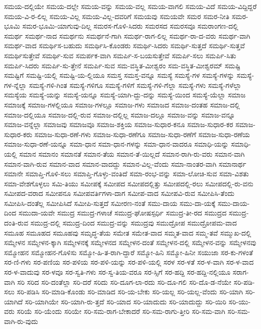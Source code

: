 {ಸಮಯ-ದಲ್ಲಿಯೇ
ಸಮಯ-ದಲ್ಲೇ
ಸಮಯ-ವನ್ನು
ಸಮಯ-ವಲ್ಲ
ಸಮಯ-ವಾಗಲಿ
ಸಮಯ-ವಿದೆ
ಸಮಯ-ವಿದ್ದಿದ್ದರೆ
ಸಮಯ-ವಿ-ರ-ಲಿಲ್ಲ
ಸಮಯ-ವಿಲ್ಲ
ಸಮಯ-ವಿಲ್ಲ-ದವರಿಗೆ
ಸಮಯವು
ಸಮಯವೇ
ಸಮರ
ಸಮರ-ನೀತಿ
ಸಮರ-ಭೂಮಿ
ಸಮರ-ಭೂಮಿ-ಯಾಗುವು-ದಿಲ್ಲ
ಸಮರಸ-ಗೊಳಿ-ಸಿದರು
ಸಮರಸದ
ಸಮರಸವೂ
ಸಮರಾಂಗಣ-ದಲ್ಲಿ
ಸಮರ್ಥ
ಸಮರ್ಥ-ನಾದ
ಸಮರ್ಥನು
ಸಮರ್ಥನೆ-ಗಾಗಿ
ಸಮರ್ಥ-ರಾಗ-ಲಿಲ್ಲ
ಸಮರ್ಥ-ರಾ-ದ-ವರು
ಸಮರ್ಥ-ವಾಗಿ
ಸಮರ್ಥ-ವಾದ
ಸಮರ್ಥಿಸ-ಬಹುದು
ಸಮರ್ಥಿಸಿ-ಕೊಂಡರು
ಸಮರ್ಥಿ-ಸಿದರು
ಸಮರ್ಥಿ-ಸುತ್ತದೆ
ಸಮರ್ಥಿ-ಸುತ್ತವೆ
ಸಮರ್ಥಿಸುತ್ತೇವೆ
ಸಮರ್ಥಿ-ಸುವ
ಸಮರ್ಪಕ-ವಾಗಿ
ಸಮರ್ಪಿ-ಸ-ಬಯಸುತ್ತೇವೆ
ಸಮರ್ಪಿ-ಸಲು
ಸಮರ್ಪಿ-ಸಿತು
ಸಮರ್ಪಿ-ಸಿದರು
ಸಮರ್ಪಿ-ಸು-ತ್ತೇನೆ
ಸಮರ್ಪಿ-ಸುವ
ಸಮ-ವಸ್ಥಿತ-ಮೀಶ್ವರಂ
ಸಮ-ವಸ್ಥಿತ-ಮೀಶ್ವರಮ್
ಸಮಷ್ಟಿ
ಸಮಷ್ಟಿಗೆ
ಸಮಷ್ಟಿ-ಯಲ್ಲಿ
ಸಮಷ್ಟಿ-ಯ-ಲ್ಲಿಯೂ
ಸಮಸ್ತ
ಸಮಸ್ತ-ವನ್ನೂ
ಸಮಸ್ಯೆ
ಸಮಸ್ಯೆ-ಗಳ
ಸಮಸ್ಯೆ-ಗಳನ್ನು
ಸಮಸ್ಯೆ-ಗಳ-ನ್ನೆಲ್ಲಾ
ಸಮಸ್ಯೆ-ಗಳಿ-ಗಿಂತ
ಸಮಸ್ಯೆ-ಗಳಿಗೂ
ಸಮಸ್ಯೆ-ಗಳಿಗೆ
ಸಮಸ್ಯೆ-ಗಳಿ-ಗೆಲ್ಲಾ
ಸಮಸ್ಯೆ-ಗಳು
ಸಮಸ್ಯೆ-ಗಳೆಲ್ಲಾ
ಸಮಸ್ಯೆಯ
ಸಮಸ್ಯೆ-ಯನ್ನು
ಸಮಸ್ಯೆ-ಯನ್ನೂ
ಸಮಸ್ಯೆ-ಯಾಗಿ-ದ್ದು-ದನ್ನು
ಸಮಸ್ಯೆ-ಯಿಂದ
ಸಮಸ್ಯೆ-ಯೆಲ್ಲಾ
ಸಮಾಜ
ಸಮಾಜಕ್ಕೆ
ಸಮಾಜ-ಗಳಲ್ಲಿಯೂ
ಸಮಾಜ-ಗಳಲ್ಲೂ
ಸಮಾಜ-ಗಳು
ಸಮಾಜದ
ಸಮಾಜ-ದಂತಹ
ಸಮಾಜ-ದಲ್ಲಿ
ಸಮಾಜ-ದಲ್ಲಿಯೂ
ಸಮಾಜ-ದಲ್ಲಿ-ರುವ
ಸಮಾಜ-ದಲ್ಲಿಲ್ಲ
ಸಮಾಜ-ದಲ್ಲೂ
ಸಮಾಜ-ವನ್ನು
ಸಮಾಜ-ವನ್ನೂ
ಸಮಾಜ-ವನ್ನೆಲ್ಲಾ
ಸಮಾಜವು
ಸಮಾಜವೂ
ಸಮಾಜ-ಶಕ್ತಿಯ
ಸಮಾಜ-ಸುಧಾರ-ಕನೂ
ಸಮಾಜ-ಸುಧಾರ-ಕರ
ಸಮಾಜ-ಸುಧಾರ-ಕರು
ಸಮಾಜ-ಸುಧಾ-ರಣೆ-ಗಳು
ಸಮಾಜ-ಸುಧಾ-ರಣೆಗೂ
ಸಮಾಜ-ಸುಧಾ-ರಣೆಗೆ
ಸಮಾಜ-ಸುಧಾ-ರಣೆಯ
ಸಮಾಜ-ಸುಧಾ-ರಣೆ-ಯನ್ನೂ
ಸಮಾ-ಧಾನ
ಸಮಾ-ಧಾನ-ಗಳನ್ನು
ಸಮಾ-ಧಾನ-ವಾದರೂ
ಸಮಾಧಿ-ಯನ್ನು
ಸಮಾಧಿ-ಯಲ್ಲಿ
ಸಮಾನ
ಸಮಾನಂ
ಸಮಾನತೆ
ಸಮಾನ-ತೆಯ
ಸಮಾನ-ತೆ-ಯಿಲ್ಲದೆ
ಸಮಾನ-ರಾಗಿ-ರು-ವರು
ಸಮಾನ-ವಾಗಿ
ಸಮಾನ-ವಾಗಿ-ರುವ
ಸಮಾನ-ವಾದ
ಸಮಾನ-ವಾದದ್ದು
ಸಮಾನ-ವಿಲ್ಲ-ವೆಂದು
ಸಮಾ-ನಾಂತರ-ವಾಗಿ
ಸಮಾನಾರ್ಥ
ಸಮಾನೇ
ಸಮಾಪ್ತಿ-ಗೊಳಿ-ಸಲು
ಸಮಾಪ್ತಿ-ಗೊಳ್ಳು-ವಂತಿದೆ
ಸಮಾ-ರಂಭ-ವನ್ನು
ಸಮಾ-ಲೋಚಿ-ಸುವ
ಸಮಾ-ವಿಶತು
ಸಮಾ-ವೇಶಗೊಳ್ಳಲು
ಸಮಿ-ತಿಯು
ಸಮೀಪಕ್ಕೆ
ಸಮೀಪದ
ಸಮೀಪದಲ್ಲಿತ್ತು
ಸಮೀಪದಲ್ಲಿ-ರಲು
ಸಮೀಪದಲ್ಲಿ-ರು-ವನು
ಸಮೀಪದ-ವರಾದ
ಸಮೀಪನೂ
ಸಮೀಪವರ್ತಿಗಳಾ-ದಾಗ
ಸಮೀಪ-ವಾದ
ಸಮೀಪವಿ-ರುವ
ಸಮೀಪಿಸಿ-ತೆಂದು
ಸಮೀಪಿಸಿ-ದಂತೆಲ್ಲ
ಸಮೀಪಿಸಿದೆ
ಸಮೀಪಿ-ಸುತ್ತದೆ
ಸಮೀರಣ-ನಂತೆ
ಸಮು-ದಾಯ
ಸಮು-ದಾ-ಯಕ್ಕೆ
ಸಮು-ದಾಯ-ದಿಂದ
ಸಮುದಾ-ಯವೇ
ಸಮುದ್ರ
ಸಮುದ್ರ-ಗಳಾಚೆ
ಸಮುದ್ರ-ಘೋಷಸ್ಪರ್ಧಿ
ಸಮುದ್ರ-ತೀ-ರದ
ಸಮುದ್ರದ
ಸಮುದ್ರ-ದಂತಿ-ರುವ
ಸಮುದ್ರ-ದಲ್ಲಿ
ಸಮುದ್ರ-ದಿಂದ
ಸಮುದ್ರ-ವನ್ನು
ಸಮುದ್ರವು
ಸಮುದ್ರೋಪ
ಸಮುದ್ರೋಪಮ-ವಾದ
ಸಮೂಹ
ಸಮೂಹದ
ಸಮೂಹವು
ಸಮೃದ್ಧ-ತೆಯ
ಸಮೇತ
ಸಮೇತ-ವಾದ
ಸಮ್ಮತ-ವಾದ
ಸಮ್ಮ-ತವೆ
ಸಮ್ಮುಖ-ದಲ್ಲಿ
ಸಮ್ಮೇಳನ
ಸಮ್ಮೇಳನ-ಕ್ಕಾಗಿ
ಸಮ್ಮೇಳನಕ್ಕೆ
ಸಮ್ಮೇಳನದ
ಸಮ್ಮೇಳನ-ದಂತೆ
ಸಮ್ಮೇಳನ-ದಲ್ಲಿ
ಸಮ್ಮೇಳನ-ವನ್ನು
ಸಮ್ಮೇಳನವು
ಸಮ್ಮೋಹನ
ಸಮ್ಮೋಹನ-ಗೊಳಿಸು
ಸಮ್ಮೋ-ಹಿ-ತ-ರಾಗಿ-ದ್ದಾರೆ
ಸಮ್ಮೋ-ಹಿನಿ
ಸಮ್ಮೋ-ಹಿನೀ
ಸಯುಜಾ
ಸರ-ಕು-ಗಳಂತೆ
ಸರ-ಣಿ-ಗಳು
ಸರ-ಪಣಿಯ
ಸರ-ಪಳಿಯ
ಸರ-ಪಳಿ-ಯನ್ನು
ಸರ-ಪಳಿ-ಯಲ್ಲಿ
ಸರಳ
ಸರ-ಳತೆ
ಸರ-ಳ-ವಾಗಿ
ಸರ-ಳ-ವಾದ
ಸರ-ಳ-ವಾದುವು
ಸರ-ಳವೂ
ಸರ-ಸ್ವತಿ-ಗಳು
ಸರ-ಸ್ವ-ತಿಯ-ವರೂ
ಸರ-ಸ್ಸಿಗೆ
ಸರ-ಹದ್ದಿ
ಸರ-ಹದ್ದಿ-ನಲ್ಲಿಯೂ
ಸರಾಗ-ವಾಗಿ
ಸರಿ
ಸರಿದ
ಸರಿ-ದಂತೆಲ್ಲಾ
ಸರಿ-ದರೆ
ಸರಿದು
ಸರಿ-ದೂಗ-ಲಾ-ರದು
ಸರಿ-ದೂ-ಗಲಿ
ಸರಿ-ದೊ-ಡ-ನೆಯೇ
ಸರಿ-ಪಡಿ-ಸಲು
ಸರಿ-ಪಡಿಸಿ
ಸರಿ-ಮಾಡಿ-ಕೊಂಡು
ಸರಿ-ಮಾಡಿದ
ಸರಿ-ಯ-ಬೇಕು
ಸರಿ-ಯಲ್ಲ
ಸರಿ-ಯಲ್ಲ-ವೆಂದು
ಸರಿ-ಯಾಗಿ
ಸರಿ-ಯಾಗಿದೆ
ಸರಿ-ಯಾಗಿಯೇ
ಸರಿ-ಯಾಗಿ-ರು-ತ್ತದೆ
ಸರಿ-ಯಾದ
ಸರಿ-ಯಾದುದು
ಸರಿ-ಯಾದುದ್ದು
ಸರಿ-ಯಿರಿ
ಸರಿ-ಯು-ವರು
ಸರಿಯೆ
ಸರಿ-ಯೆಂದು
ಸರಿಯೇ
ಸರಿ-ಸಮ-ರಾಗ-ಬೇಕಾದರೆ
ಸರಿ-ಸಮ-ರಾಗು-ತ್ತೀರಿ
ಸರಿ-ಸಮ-ವಾಗಿ
ಸರಿ-ಸಮ-ವಾಗಿ-ರು-ವುದು
}
